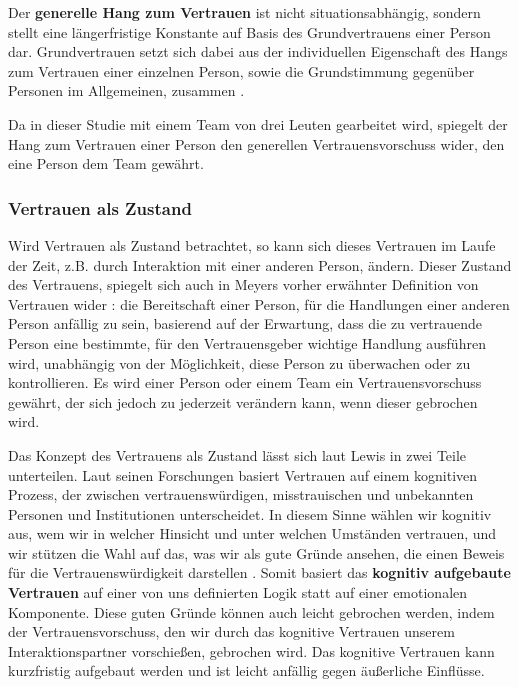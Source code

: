 \documentclass[a4paper,11pt]{article}%
\renewcommand{\\}{\vspace*{0.5\baselineskip} \newline}
\begin{document}
Der \textbf{generelle Hang zum Vertrauen} ist nicht situationsabhängig, sondern stellt eine längerfristige Konstante auf Basis des Grundvertrauens einer Person dar. Grundvertrauen setzt sich dabei aus der individuellen Eigenschaft des Hangs zum Vertrauen einer einzelnen Person, sowie die Grundstimmung gegenüber Personen im Allgemeinen, zusammen \citep{couch1996assessment}.

Da in dieser Studie mit einem Team von drei Leuten gearbeitet wird, spiegelt der Hang zum Vertrauen einer Person den generellen Vertrauensvorschuss wider, den eine Person dem Team gewährt.

	\subsubsection{Vertrauen als Zustand}
\label{Vertrauen als Zustand}
Wird Vertrauen als \dq{}Zustand\dq{} betrachtet, so kann sich dieses Vertrauen im Laufe der Zeit, z.B. durch Interaktion mit einer anderen Person, ändern. Dieser \dq Zustand\dq{} des Vertrauens, spiegelt sich auch in Meyers \citep[p.712]{mayer1995integrative} vorher erwähnter Definition von Vertrauen wider :\\ \dq die Bereitschaft einer Person, für die Handlungen einer anderen Person anfällig zu sein, basierend auf der Erwartung, dass die zu vertrauende Person eine bestimmte, für den Vertrauensgeber wichtige Handlung ausführen wird, unabhängig von der Möglichkeit, diese Person zu überwachen oder zu kontrollieren.\dq{} \\
Es wird einer Person oder einem Team ein Vertrauensvorschuss gewährt, der sich jedoch zu jederzeit verändern kann, wenn dieser gebrochen wird.


Das Konzept des Vertrauens als Zustand lässt sich laut Lewis \citep[p.970-971]{lewis1985trust} in zwei Teile unterteilen.\newline
Laut seinen Forschungen basiert Vertrauen \dq auf einem kognitiven Prozess, der zwischen vertrauenswürdigen, misstrauischen und unbekannten Personen und Institutionen unterscheidet. In diesem Sinne wählen wir kognitiv aus, wem wir in welcher Hinsicht und unter welchen Umständen vertrauen, und wir stützen die Wahl auf das, was wir als \dq gute Gründe\dq{} ansehen, die einen Beweis für die Vertrauenswürdigkeit darstellen \dq{}\citep[p.970]{lewis1985trust}.
Somit basiert das \textbf{kognitiv aufgebaute Vertrauen} auf einer von uns definierten Logik statt auf einer emotionalen Komponente. Diese \dq{}guten Gründe\dq{} können auch leicht gebrochen werden, indem der Vertrauensvorschuss, den wir durch das kognitive Vertrauen unserem Interaktionspartner vorschießen, gebrochen wird.
Das kognitive Vertrauen kann kurzfristig aufgebaut werden und ist leicht anfällig gegen äußerliche Einflüsse. 
\end{document}
